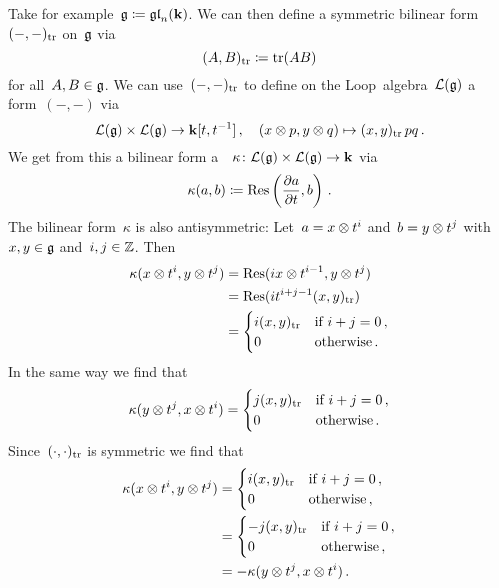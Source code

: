 \begin{example}
  Take for example~$\mathfrak{g} \coloneqq \mathfrak{gl}_n(\mathbf{k})$.
  We can then define a symmetric bilinear form~$(-,-)_{\operatorname{tr}}$ on~$\mathfrak{g}$ via
  \[
    (A,B)_{\operatorname{tr}}
    \coloneqq
    \operatorname{tr}(AB)
  \]
  for all~$A, B \in \mathfrak{g}$.
  We can use~$(-,-)_{\operatorname{tr}}$ to define on the Loop~algebra~$\mathcal{L}(\mathfrak{g})$ a~{\bilinear{$\kf[t,t^{-1}]$}} form~$(-,-)$ via
  \[
    \mathcal{L}(\mathfrak{g}) \times \mathcal{L}(\mathfrak{g})
    \to
    \mathbf{k}[t,t^{-1}] \,,
    \quad
    (x \otimes p, y \otimes q)
    \mapsto
    (x,y)_{\operatorname{tr}} \, pq \,.
  \]
  We get from this a bilinear form a~{\twococycle}~$\kappa \colon \mathcal{L}(\mathfrak{g}) \times \mathcal{L}(\mathfrak{g}) \to \mathbf{k}$ via
  \[
    \kappa(a,b)
    \coloneqq
    \operatorname{Res}\left( \frac{\partial a}{\partial t}, b \right) \,.
  \]
  The bilinear form~$\kappa$ is also antisymmetric:
  Let~$a = x \otimes t^i$ and~$b = y \otimes t^j$ with~$x,y \in \mathfrak{g}$ and~$i,j \in \mathbb{Z}$.
  Then
  \begin{align*}
    \kappa(x \otimes t^i, y \otimes t^j)
    &=
    \operatorname{Res}(i x \otimes t^{i-1}, y \otimes t^j)
    \\
    &= 
    \operatorname{Res}(i t^{i+j-1} (x,y)_{\operatorname{tr}})
    \\
    &=
    \begin{cases}
      i (x,y)_{\operatorname{tr}} & \text{if~$i+j = 0$} \,,\\
                  0 & \text{otherwise}  \,.
    \end{cases}
  \end{align*}
  In the same way we find that
  \[
    \kappa(y \otimes t^j, x \otimes t^i)
    =
    \begin{cases}
      j (x,y)_{\operatorname{tr}} & \text{if~$i+j = 0$} \,, \\
                  0 & \text{otherwise}  \,.
    \end{cases}
  \]
  Since~$(\cdot,\cdot)_{\operatorname{tr}}$ is symmetric we find that
  \begin{align*}
    \kappa(x \otimes t^i, y \otimes t^j)
    &=
    \begin{cases}
    i (x,y)_{\operatorname{tr}} & \text{if~$i+j = 0$} \,, \\
                0 & \text{otherwise}  \,,
    \end{cases} \\
    &=
    \begin{cases}
    -j (x,y)_{\operatorname{tr}} & \text{if~$i+j = 0$}  \,, \\
                  0 & \text{otherwise}  \,,
    \end{cases} \\
    &=
    -\kappa(y \otimes t^j, x \otimes t^i) \,.
  \end{align*}
\end{example}


